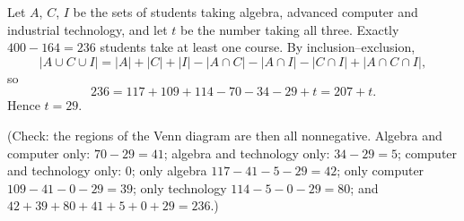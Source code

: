 Let $A$, $C$, $I$ be the sets of students taking algebra, advanced computer and industrial technology, and let $t$ be the number taking all three. Exactly $400-164=236$ students take at least one course. By inclusion--exclusion,
\[
|A\cup C\cup I|=|A|+|C|+|I|-|A\cap C|-|A\cap I|-|C\cap I|+|A\cap C\cap I|,
\]
so
\[
236=117+109+114-70-34-29+t=207+t .
\]
Hence $t=\boxed{29}$.

(Check: the regions of the Venn diagram are then all nonnegative. Algebra and computer only: $70-29=41$; algebra and technology only: $34-29=5$; computer and technology only: $0$; only algebra $117-41-5-29=42$; only computer $109-41-0-29=39$; only technology $114-5-0-29=80$; and $42+39+80+41+5+0+29=236$.)
